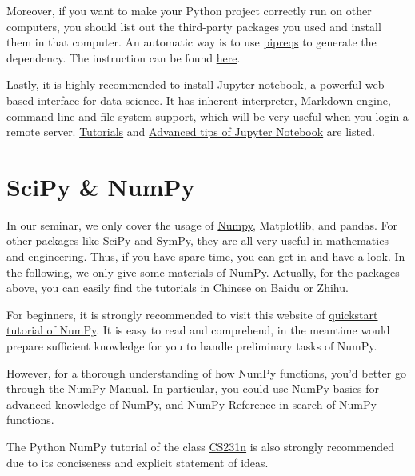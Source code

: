 \documentclass[english]{../TexTemplate/thesis}
\begin{document}
Moreover, if you want to make your Python project correctly run on other computers, you should list out the third-party packages you used and install them in that computer. An automatic way is to use \href{https://github.com/bndr/pipreqs}{pipreqs} to generate the dependency. The instruction can be found \href{https://dev.to/bhupesh/pipreqs-automatically-generate-python-dependencies-30nl}{here}.

Lastly, it is highly recommended to install \href{https://jupyter.org/}{Jupyter notebook}, a powerful web-based interface for data science. It has inherent interpreter, Markdown engine, command line and file system support, which will be very useful when you login a remote server. \href{https://www.dataquest.io/blog/jupyter-notebook-tutorial/}{Tutorials} and \href{http://liuchengxu.org/pelican-blog/jupyter-notebook-tips.html}{Advanced tips of Jupyter Notebook} are listed.

\section{SciPy \& NumPy}
In our seminar, we only cover the usage of \href{https://numpy.org/}{Numpy}, Matplotlib, and pandas.
For other packages like \href{https://docs.scipy.org/doc/scipy/reference/tutorial/index.html}{SciPy} and \href{http://docs.sympy.org/latest/tutorial/index.html}{SymPy}, they are all very useful in mathematics and engineering. Thus, if you have spare time, you can get in and have a look.
In the following, we only give some materials of NumPy.
Actually, for the packages above, you can easily find the tutorials in Chinese on Baidu or Zhihu.

For beginners, it is strongly recommended to visit this website of \href{https://docs.scipy.org/doc/numpy/user/quickstart.html}{quickstart tutorial of NumPy}. It is easy to read and comprehend, in the meantime would prepare sufficient knowledge for you to handle preliminary tasks of NumPy.

However, for a thorough understanding of how NumPy functions, you'd better go through the \href{https://docs.scipy.org/doc/numpy/index.html}{NumPy Manual}. In particular, you could use \href{https://docs.scipy.org/doc/numpy/user/basics.html}{NumPy basics} for advanced knowledge of NumPy, and \href{https://docs.scipy.org/doc/numpy/reference/index.html}{NumPy Reference} in search of NumPy functions.

The Python NumPy tutorial of the class \href{https://cs231n.github.io/python-numpy-tutorial/}{CS231n} is also strongly recommended due to its conciseness and explicit statement of ideas.
\end{document}
